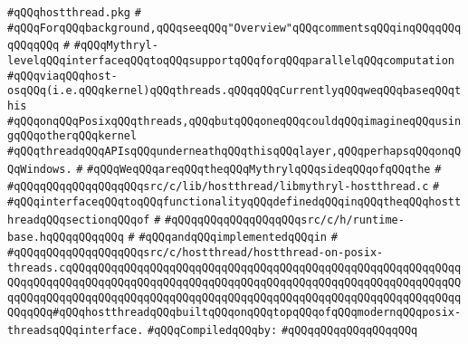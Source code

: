\label{src/lib/std/src/hostthread.pkg}
\verb|#qQQqhostthread.pkg|\newline
\verb|#|\newline
\verb|#qQQqForqQQqbackground,qQQqseeqQQq"Overview"qQQqcommentsqQQqinqQQqqQQqqQQqqQQq|\newline
\verb|#|\newline
\verb|#qQQqMythryl-levelqQQqinterfaceqQQqtoqQQqsupportqQQqforqQQqparallelqQQqcomputation|\newline
\verb|#qQQqviaqQQqhost-osqQQq(i.e.qQQqkernel)qQQqthreads.qQQqqQQqCurrentlyqQQqweqQQqbaseqQQqthis|\newline
\verb|#qQQqonqQQqPosixqQQqthreads,qQQqbutqQQqoneqQQqcouldqQQqimagineqQQqusingqQQqotherqQQqkernel|\newline
\verb|#qQQqthreadqQQqAPIsqQQqunderneathqQQqthisqQQqlayer,qQQqperhapsqQQqonqQQqWindows.|\newline
\verb|#|\newline
\verb|#qQQqWeqQQqareqQQqtheqQQqMythrylqQQqsideqQQqofqQQqthe|\newline
\verb|#|\newline
\verb|#qQQqqQQqqQQqqQQqqQQqsrc/c/lib/hostthread/libmythryl-hostthread.c|\newline
\verb|#|\newline
\verb|#qQQqinterfaceqQQqtoqQQqfunctionalityqQQqdefinedqQQqinqQQqtheqQQqhostthreadqQQqsectionqQQqof|\newline
\verb|#|\newline
\verb|#qQQqqQQqqQQqqQQqqQQqsrc/c/h/runtime-base.hqQQqqQQqqQQq|\newline
\verb|#|\newline
\verb|#qQQqandqQQqimplementedqQQqin|\newline
\verb|#|\newline
\verb|#qQQqqQQqqQQqqQQqqQQqsrc/c/hostthread/hostthread-on-posix-threads.cqQQqqQQqqQQqqQQqqQQqqQQqqQQqqQQqqQQqqQQqqQQqqQQqqQQqqQQqqQQqqQQqqQQqqQQqqQQqqQQqqQQqqQQqqQQqqQQqqQQqqQQqqQQqqQQqqQQqqQQqqQQqqQQqqQQqqQQqqQQqqQQqqQQqqQQqqQQqqQQqqQQqqQQqqQQqqQQqqQQqqQQqqQQqqQQqqQQqqQQqqQQqqQQq#qQQqhostthreadqQQqbuiltqQQqonqQQqtopqQQqofqQQqmodernqQQqposix-threadsqQQqinterface.|\newline
\newline
\verb|#qQQqCompiledqQQqby:|\newline
\verb|#qQQqqQQqqQQqqQQqqQQq|\newline
